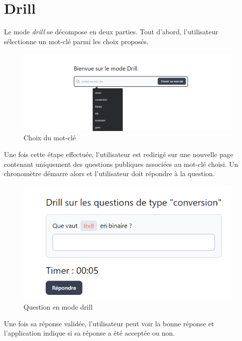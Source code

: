 \section{Drill}
Le mode \emph{drill} se décompose en deux parties. Tout d'abord, l'utilisateur sélectionne un mot-clé parmi les choix proposés.


\begin{center}
    \begin{figure}[H]
        \includegraphics[width=\textwidth]{./assets/figures/drill1.png}
        \caption{Choix du mot-clé}
    \end{figure}
\end{center}

Une fois cette étape effectuée, l'utilisateur est redirigé sur une nouvelle page contenant uniquement des questions publiques associées au mot-clé choisi.
Un chronomètre démarre alors et l'utilisateur doit répondre à la question.
\begin{center}
    \begin{figure}[H]
        \includegraphics[width=\textwidth]{./assets/figures/drill2.png}
        \caption{Question en mode drill}
    \end{figure}
\end{center}

Une fois sa réponse validée, l'utilisateur peut voir la bonne réponse et l'application indique si sa réponse a été acceptée ou non.


